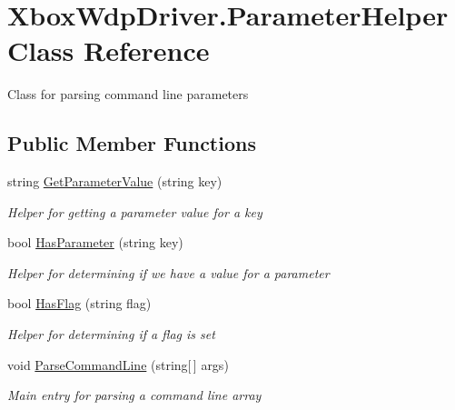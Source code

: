\hypertarget{class_xbox_wdp_driver_1_1_parameter_helper}{}\section{Xbox\+Wdp\+Driver.\+Parameter\+Helper Class Reference}
\label{class_xbox_wdp_driver_1_1_parameter_helper}


Class for parsing command line parameters  


\subsection*{Public Member Functions}
\begin{DoxyCompactItemize}
\item 
string \hyperlink{class_xbox_wdp_driver_1_1_parameter_helper_aa81023d5fb6fe633465d7ae116240dd1}{Get\+Parameter\+Value} (string key)
\begin{DoxyCompactList}\small\item\em Helper for getting a parameter value for a key \end{DoxyCompactList}\item 
bool \hyperlink{class_xbox_wdp_driver_1_1_parameter_helper_a55b9ba30ca5e442297440aee744c7c86}{Has\+Parameter} (string key)
\begin{DoxyCompactList}\small\item\em Helper for determining if we have a value for a parameter \end{DoxyCompactList}\item 
bool \hyperlink{class_xbox_wdp_driver_1_1_parameter_helper_a71b7c59c3b39cd7fb068294b4e85d325}{Has\+Flag} (string flag)
\begin{DoxyCompactList}\small\item\em Helper for determining if a flag is set \end{DoxyCompactList}\item 
void \hyperlink{class_xbox_wdp_driver_1_1_parameter_helper_a3b3817d2f6726f9db220cc87148e3997}{Parse\+Command\+Line} (string\mbox{[}$\,$\mbox{]} args)
\begin{DoxyCompactList}\small\item\em Main entry for parsing a command line array \end{DoxyCompactList}\end{DoxyCompactItemize}
